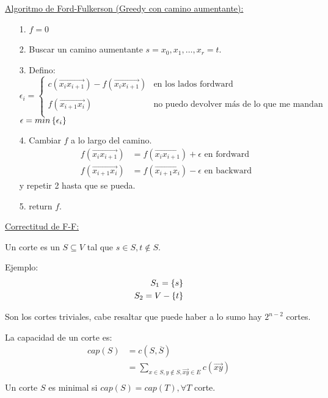 \documentclass[12pt,a4paper]{article}
\begin{document}
\underline{Algoritmo de Ford-Fulkerson (Greedy con camino aumentante):}
\begin{itemize}
    \item [1.] $f = 0$
    \item [2.] Buscar un camino aumentante $s=x_{0},x_{1},\ldots,x_{r}=t$.
    \item [3.] Defino:
        $$\epsilon_{i}= \left\{ \begin{array}{lcc}
        c(\overrightarrow{x_{i}x_{i+1}}) - f(\overrightarrow{x_{i}x_{i+1}}) & \text{en los lados fordward} \\
        \\ f(\overrightarrow{x_{i+1}x_{i}})& \text{no puedo devolver más de lo que me mandan}\\
        \end{array}
        \right.$$
        $\epsilon = min\left\lbrace \epsilon_{i} \right\rbrace$
    \item [4.] Cambiar $f$ a lo largo del camino.
        \begin{align*}
            f(\overrightarrow{x_{i}x_{i+1}}) &= f(\overrightarrow{x_{i}x_{i+1}}) + \epsilon\,\, \text{en fordward}\\
            f(\overrightarrow{x_{i+1}x_{i}}) &= f(\overrightarrow{x_{i+1}x_{i}}) - \epsilon\,\, \text{en backward}
        \end{align*}
        y repetir 2 hasta que se pueda.
    \item [5.]
        return $f$.
\end{itemize}

\underline{Correctitud de F-F:}
\begin{definition} Un corte es un $S \subseteq V$ tal que $s \in S, t \notin S$.
\end{definition}

Ejemplo:
\begin{align*}
    S_{1} = \left\lbrace s \right\rbrace\\
    S_{2} = V - \left\lbrace t \right\rbrace\\
\end{align*}

Son los cortes triviales, cabe resaltar que puede haber a lo sumo hay $2^{n-2}$ cortes.
\medskip

La capacidad de un corte es:
\begin{align*}
    cap(S) &= c(S,\overline{S} ) \\
    &= \sum_{x \in S, y\notin S, \overrightarrow{xy}\in E} c(\overrightarrow{xy})\\
\end{align*}
Un corte $S$ es minimal si $cap(S) = cap(T), \forall T$ corte.
\end{document}
